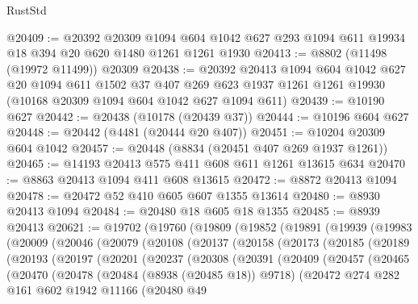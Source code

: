 \begin{lexlean}{RustStd}
\begin{coremodule}
@20409 := @20392
    @20309
    @1094
    @604
    @1042
    @627
    @293
    @1094
    @611
    @19934
    @18
    @394
    @20
    @620
    @1480
    @1261
    @1261
    @1930
@20413 := @8802 (@11498 (@19972 @11499)) @20309
@20438 := @20392
    @20413
    @1094
    @604
    @1042
    @627
    @20
    @1094
    @611
    @1502
    @37
    @407
    @269
    @623
    @1937
    @1261
    @1261
    @19930
    (@10168 @20309 @1094 @604 @1042 @627 @1094 @611)
@20439 := @10190 @627
@20442 := @20438 (@10178 (@20439 @37))
@20444 := @10196 @604 @627
@20448 := @20442 (@4481 (@20444 @20 @407))
@20451 := @10204 @20309 @604 @1042
@20457 := @20448 (@8834 (@20451 @407 @269 @1937 @1261))
@20465 := @14193 @20413 @575 @411 @608 @611 @1261 @13615 @634
@20470 := @8863 @20413 @1094 @411 @608 @13615
@20472 := @8872 @20413 @1094
@20478 := @20472 @52 @410 @605 @607 @1355 @13614
@20480 := @8930 @20413 @1094
@20484 := @20480 @18 @605 @18 @1355
@20485 := @8939 @20413
@20621 := @19702
    (@19760
      (@19809
        (@19852
          (@19891
            (@19939
              (@19983
                (@20009
                  (@20046
                    (@20079
                      (@20108
                        (@20137
                          (@20158
                            (@20173
                              (@20185
                                (@20189
                                  (@20193
                                    (@20197
                                      (@20201
                                        (@20237
                                          (@20308
                                            (@20391
                                              (@20409
                                                (@20457
                                                  (@20465
                                                    (@20470
                                                      (@20478
                                                        (@20484 (@8938 (@20485 @18)) @9718)
                                                        (@20472
                                                          @274
                                                          @282
                                                          @161
                                                          @602
                                                          @1942
                                                          @11166
                                                          (@20480
                                                            @49

\end{coremodule}
\end{lexlean}
